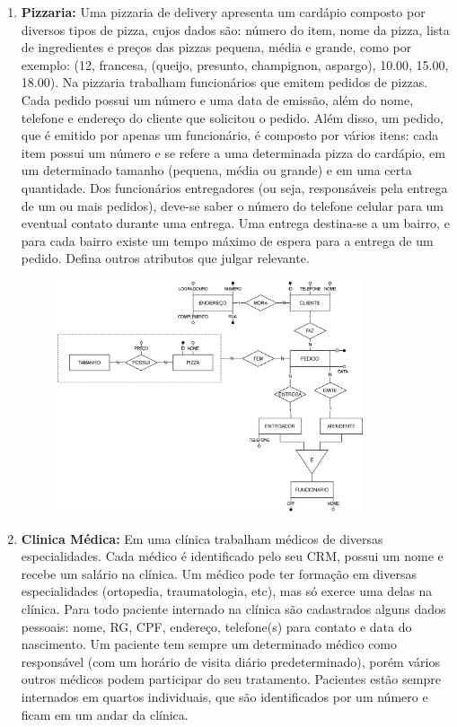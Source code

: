 \documentclass[a4paper, 12pt]{article}
\begin{document}
	\begin{enumerate}
		
		\item \textbf{Pizzaria:} Uma pizzaria de delivery apresenta um cardápio composto por diversos tipos de pizza, cujos
		dados são: número do item, nome da pizza, lista de ingredientes e preços das pizzas pequena,
		média e grande, como por exemplo: (12, francesa, (queijo, presunto, champignon, aspargo),
		10.00, 15.00, 18.00). Na pizzaria trabalham funcionários que emitem pedidos de pizzas. Cada
		pedido possui um número e uma data de emissão, além do nome, telefone e endereço do
		cliente que solicitou o pedido. Além disso, um pedido, que é emitido por apenas um funcionário,
		é composto por vários itens: cada item possui um número e se refere a uma determinada
		pizza do cardápio, em um determinado tamanho (pequena, média ou grande) e em uma certa
		quantidade. Dos funcionários entregadores (ou seja, responsáveis pela entrega de um ou mais
		pedidos), deve-se saber o número do telefone celular para um eventual contato durante uma
		entrega. Uma entrega destina-se a um bairro, e para cada bairro existe um tempo máximo de
		espera para a entrega de um pedido. Defina outros atributos que julgar relevante.
		
		\begin{figure}[H]
			\centering
			\includegraphics[width=0.85\textwidth]{LISTA 01 - EX 1 RESOLUÇÃO.png}
		\end{figure}
		\newpage
		
		\onehalfspacing
		\item \textbf{Clinica Médica:} Em uma clínica trabalham médicos de diversas especialidades. Cada médico é identificado
		pelo seu CRM, possui um nome e recebe um salário na clínica. Um médico pode ter formação em diversas especialidades (ortopedia, traumatologia, etc), mas só exerce uma delas
		na clínica. Para todo paciente internado na clínica são cadastrados alguns dados pessoais:
		nome, RG, CPF, endereço, telefone(s) para contato e data do nascimento. Um paciente tem
		sempre um determinado médico como responsável (com um horário de visita diário predeterminado), porém vários outros médicos podem participar do seu tratamento. Pacientes estão
		sempre internados em quartos individuais, que são identificados por um número e ficam em
		um andar da clínica. 
		

\end{enumerate}
\end{document}

